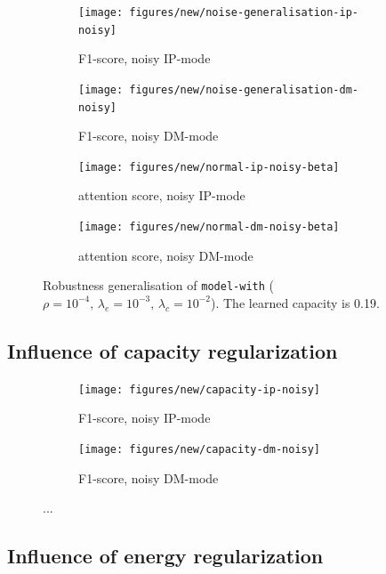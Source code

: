 \begin{figure}[!h]
\centering
\begin{subfigure}{.5\textwidth}
  \centering
  \texttt{[image: figures/new/noise-generalisation-ip-noisy]}
  \caption{F1-score, noisy IP-mode}
  \label{fig:exp-att-shift-6-a}
\end{subfigure}%
\begin{subfigure}{.5\textwidth}
  \centering
  \texttt{[image: figures/new/noise-generalisation-dm-noisy]}
  \caption{F1-score, noisy DM-mode}
 \label{fig:exp-att-shift-6-b} 
\end{subfigure}
\begin{subfigure}{.5\textwidth}
  \centering
  \texttt{[image: figures/new/normal-ip-noisy-beta]}
  \caption{attention score, noisy IP-mode}
   \label{fig:exp-att-shift-6-c} 
\end{subfigure}%
\begin{subfigure}{.5\textwidth}
  \centering
  \texttt{[image: figures/new/normal-dm-noisy-beta]}
  \caption{attention score, noisy DM-mode}
   \label{fig:exp-att-shift-6-d} 
\end{subfigure}
\caption[Robustness generalisation]{Robustness generalisation of \texttt{model-with} ($\rho=10^{-4},\,\lambda_e=10^{-3},\,\lambda_c=10^{-2}$). The learned capacity is 0.19.}
\label{fig:exp-att-shift-6}
\end{figure}

\subsection*{Influence of capacity regularization}
\begin{figure}[!h]
\centering
\begin{subfigure}{.5\textwidth}
  \centering
  \texttt{[image: figures/new/capacity-ip-noisy]}
  \caption{F1-score, noisy IP-mode}
  \label{fig:exp-att-shift-7-a}
\end{subfigure}%
\begin{subfigure}{.5\textwidth}
  \centering
  \texttt{[image: figures/new/capacity-dm-noisy]}
  \caption{F1-score, noisy DM-mode}
  \label{fig:exp-att-shift-7-b}
\end{subfigure}
\caption[Influence of capacity regularization]{...}
\label{fig:exp-att-shift-7}
\end{figure}

\subsection*{Influence of energy regularization}

